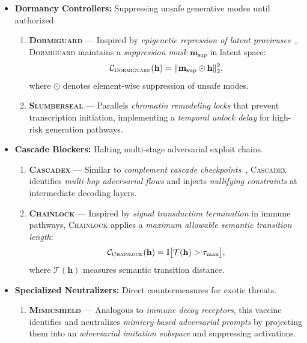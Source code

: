 \begin{itemize}
    \item \textbf{Dormancy Controllers:} Suppressing unsafe generative modes until authorized.
    \begin{enumerate}
        \item \textbf{\textsc{Dormiguard}} — Inspired by \emph{epigenetic repression of latent proviruses}~\cite{roychoudhury2020herpesvirus,jaenisch2003epigenetic}, \textsc{Dormiguard} maintains a \emph{suppression mask} $\mathbf{m}_\mathrm{sup}$ in latent space:
        \[
        \mathcal{C}_{\textsc{Dormiguard}}(\mathbf{h}) = \|\mathbf{m}_\mathrm{sup} \odot \mathbf{h}\|_2^2,
        \]
        where $\odot$ denotes element-wise suppression of unsafe modes.

        \item \textbf{\textsc{Slumberseal}} — Parallels \emph{chromatin remodeling locks} that prevent transcription initiation, implementing a \emph{temporal unlock delay} for high-risk generation pathways.
    \end{enumerate}

    \item \textbf{Cascade Blockers:} Halting multi-stage adversarial exploit chains.
    \begin{enumerate}
        \item \textbf{\textsc{Cascadex}} — Similar to \emph{complement cascade checkpoints}~\cite{walport2001complement}, \textsc{Cascadex} identifies \emph{multi-hop adversarial flows} and injects \emph{nullifying constraints} at intermediate decoding layers.

        \item \textbf{\textsc{Chainlock}} — Inspired by \emph{signal transduction termination} in immune pathways, \textsc{Chainlock} applies a \emph{maximum allowable semantic transition length}:
        \[
        \mathcal{C}_{\textsc{Chainlock}}(\mathbf{h}) = \mathbb{I}\big[ \mathcal{T}(\mathbf{h}) > \tau_{\max} \big],
        \]
        where $\mathcal{T}(\mathbf{h})$ measures semantic transition distance.
    \end{enumerate}

    \item \textbf{Specialized Neutralizers:} Direct countermeasures for exotic threats.
    \begin{enumerate}
        \item \textbf{\textsc{Mimicshield}} — Analogous to \emph{immune decoy receptors}, this vaccine identifies and neutralizes \emph{mimicry-based adversarial prompts} by projecting them into an \emph{adversarial imitation subspace} and suppressing activations.


\end{enumerate}
\end{itemize}
